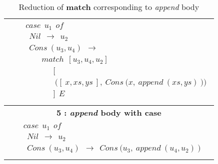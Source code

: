 \documentclass[11pt]{article}
\begin{document}
\begin{table}[h!]
{\begin{center}
\begin{tabular}{|c|c|}
\begin{minipage}{3in}
{}
\end {minipage} &
\begin{minipage}{3in}
 {
\begin{align*} 
&case~~u_1~~of\\
&~~Nil~~\to~~u_2\\
&~~Cons~(u_3,u_4)~~\to\\
&\qquad match~~[u_3,u_4,u_2]\\ 
&\qquad\quad~~\bigg[\\ 
&\qquad\quad~~~\Big([~x,xs,ys~],~Cons~\big(x,~append~(xs,ys)~\big)\Big)\\ 
&\qquad\quad~~\bigg]~~E \\
\end{align*}
}
\end {minipage}\\ 

\hline 
\multicolumn{2}{|c|}{\bf 5 : \textit{append} body with case}\\ 
\hline
\multicolumn{2}{|c|}{
\begin{minipage}{3in}
 {
\begin{align*} 
&case~~u_1~~of\\
&~~Nil~~\to~~u_2\\
&~~Cons~(u_3,u_4)~~\to~~Cons~\big(u_3,~append~(u_4,u_2)~\big)\\
\end{align*}
}
\end {minipage} 
}
\tabularnewline
\hline
\end{tabular}
\caption{Reduction of {\bf match} corresponding to \textit{append} body}
\label{Pmatch:Ex1StepWise}
\end{center}
}
\end{table}
\end{document}
